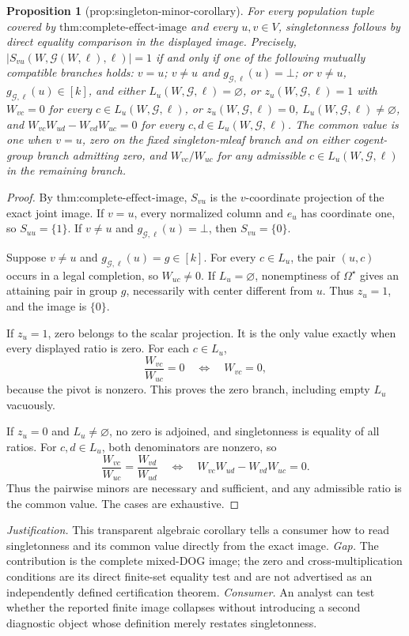 \documentclass{article}
\newtheorem{proposition}{Proposition}
\begin{document}
\begin{proposition}[prop:singleton-minor-corollary]\label{prop:singleton-minor-corollary}
For every population tuple covered by \(\text{thm:complete-effect-image}\) and every \(u,v\in V\), singletonness follows by direct equality comparison in the displayed image. Precisely, \( |S_{vu}(W,\mathcal G(W,\ell),\ell)|=1\) if and only if one of the following mutually compatible branches holds: \(v=u\); \(v\ne u\) and \(g_{\mathcal G,\ell}(u)=\bot\); or \(v\ne u\), \(g_{\mathcal G,\ell}(u)\in[k]\), and either \(L_u(W,\mathcal G,\ell)=\varnothing\), or \(z_u(W,\mathcal G,\ell)=1\) with \(W_{vc}=0\) for every \(c\in L_u(W,\mathcal G,\ell)\), or \(z_u(W,\mathcal G,\ell)=0\), \(L_u(W,\mathcal G,\ell)\ne\varnothing\), and \(W_{vc}W_{ud}-W_{vd}W_{uc}=0\) for every \(c,d\in L_u(W,\mathcal G,\ell)\). The common value is one when \(v=u\), zero on the fixed singleton-mleaf branch and on either cogent-group branch admitting zero, and \(W_{vc}/W_{uc}\) for any admissible \(c\in L_u(W,\mathcal G,\ell)\) in the remaining branch.
\end{proposition}
\begin{proof}
By \(\text{thm:complete-effect-image}\), \(S_{vu}\) is the \(v\)-coordinate projection of the exact joint image. If \(v=u\), every normalized column and \(e_u\) has coordinate one, so \(S_{uu}=\{1\}\). If \(v\ne u\) and \(g_{\mathcal G,\ell}(u)=\bot\), then \(S_{vu}=\{0\}\).

Suppose \(v\ne u\) and \(g_{\mathcal G,\ell}(u)=g\in[k]\). For every \(c\in L_u\), the pair \((u,c)\) occurs in a legal completion, so \(W_{uc}\ne0\). If \(L_u=\varnothing\), nonemptiness of \(\Omega^\star\) gives an attaining pair in group \(g\), necessarily with center different from \(u\). Thus \(z_u=1\), and the image is \(\{0\}\).

If \(z_u=1\), zero belongs to the scalar projection. It is the only value exactly when every displayed ratio is zero. For each \(c\in L_u\),
\[
\frac{W_{vc}}{W_{uc}}=0\quad\Longleftrightarrow\quad W_{vc}=0,
\]
because the pivot is nonzero. This proves the zero branch, including empty \(L_u\) vacuously.

If \(z_u=0\) and \(L_u\ne\varnothing\), no zero is adjoined, and singletonness is equality of all ratios. For \(c,d\in L_u\), both denominators are nonzero, so
\[
\frac{W_{vc}}{W_{uc}}=\frac{W_{vd}}{W_{ud}}
\quad\Longleftrightarrow\quad
W_{vc}W_{ud}-W_{vd}W_{uc}=0.
\]
Thus the pairwise minors are necessary and sufficient, and any admissible ratio is the common value. The cases are exhaustive.
\end{proof}
\par\smallskip\noindent \textit{Justification.} This transparent algebraic corollary tells a consumer how to read singletonness and its common value directly from the exact image. \textit{Gap.} The contribution is the complete mixed-DOG image; the zero and cross-multiplication conditions are its direct finite-set equality test and are not advertised as an independently defined certification theorem. \textit{Consumer.} An analyst can test whether the reported finite image collapses without introducing a second diagnostic object whose definition merely restates singletonness.
\end{document}
